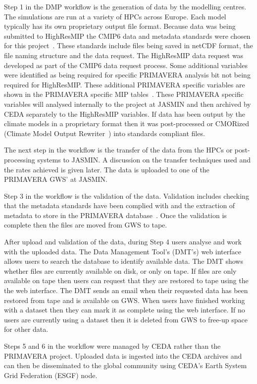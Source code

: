 \documentclass[gmd, manuscript]{copernicus}
\begin{document}
Step 1 in the DMP workflow is the generation of data  by the modelling centres. The simulations are run at a variety of HPCs across Europe. Each model typically has its own proprietary output file format. Because data was being submitted to HighResMIP the CMIP6 data and metadata standards were chosen for this project~\citep{gmd-11-3659-2018}. These standards include files being saved in netCDF format, the file naming structure and the data request. The HighResMIP data request was developed as part of the CMIP6 data request process. Some additional variables were identified as being required for specific PRIMAVERA analysis bit not being required for HighResMIP. These additional PRIMAVERA specific variables are shown in the PRIMAVERA specific MIP tables~\citep{Nadeau2018}. These PRIMAVERA specific variables will analysed internally to the project at JASMIN and then archived by CEDA separately to the HighResMIP variables. If data has been output by the climate models in a proprietary format then it was post-processed or CMORized (Climate Model Output Rewriter~\cite{Nadeau2019}) into standards compliant files.

The next step in the workflow is the transfer of the data from the HPCs or post-processing systems to JASMIN. A discussion on the transfer techniques used and the rates achieved is given later. The data is uploaded to one of the PRIMAVERA GWS' at JASMIN.

Step 3 in the workflow is the validation of the data. Validation includes checking that the metadata standards have been complied with and the extraction of metadata to store in the PRIMAVERA database~\cite{Seddon2020}. Once the validation is complete then the files are moved from GWS to tape. 

After upload and validation of the data, during Step 4 users analyse and work with the uploaded data. The Data Management Tool's (DMT's) web interface allows users to search the database to identify available data. The DMT shows whether files are currently available on disk, or only on tape. If files are only available on tape then users can request that they are restored to tape using the the web interface. The DMT sends an email when their requested data has been restored from tape and is available on GWS. When users have finished working with a dataset then they can mark it as complete using the web interface. If no users are currently using a dataset then it is deleted from GWS to free-up space for other data.

Steps 5 and 6 in the workflow were managed by CEDA rather than the PRIMAVERA project. Uploaded data is ingested into the CEDA archives and can then be disseminated to the global community using CEDA's Earth System Grid Federation (ESGF) node. 
\end{document}
